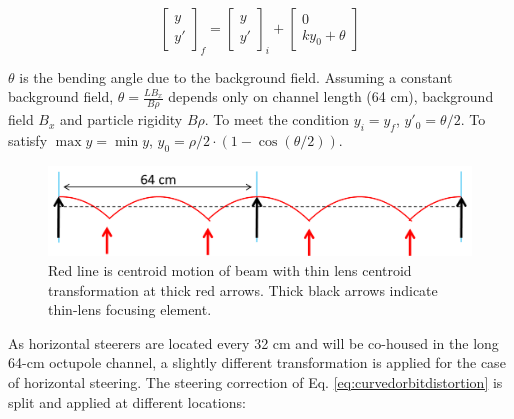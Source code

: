 \begin{equation}
\begin{bmatrix} y \\ y' \end{bmatrix}_f = \begin{bmatrix} y \\ y' \end{bmatrix}_i + \begin{bmatrix} 0 \\ ky_0 + \theta \end{bmatrix}
\label{eq:curvedorbitdistortion}
\end{equation}

$\theta$ is the bending angle due to the background field. Assuming a constant background field, $\theta = \frac{LB_x}{B \rho}$ depends only on channel length (64 cm), background field $B_x$ and particle rigidity $B \rho$. To meet the condition $y_i=y_f$, $y'_0 = \theta/2$. To satisfy $\max{y}=\min{y}$, $y_0=\rho/2 \cdot ( 1-\cos{(\theta/2)} )$.    


\begin{figure}
\centering
\includegraphics[width=\textwidth]{5.figures/steeringtolerance/horz_bg_field_distortion_cartoon.png}
\caption{Red line is centroid motion of beam with thin lens centroid transformation at thick red arrows. Thick black arrows indicate thin-lens focusing element.}
\label{fig:horzcurvedorbitdistortion}
\end{figure}

As horizontal steerers are located every 32 cm and will be co-housed in the long 64-cm octupole channel, a slightly different transformation is applied for the case of horizontal steering. The steering correction of Eq. \ref{eq:curvedorbitdistortion} is split and applied at different locations: 


